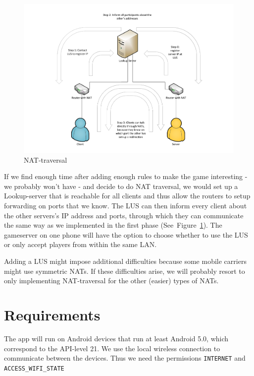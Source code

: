 \documentclass{sig-alternate}
\newcommand{\lfig}[1]{\label{fig:#1}}
\newcommand{\rfig}[1]{Figure~\ref{fig:#1}}
\begin{document}
\begin{figure}[!htbp]
	\centering
    \includegraphics[width=\columnwidth]{NATholepunching.pdf}
    \vspace{-5mm} %
	\caption{NAT-traversal}
	\lfig{nat}
\end{figure}

If we find enough time after adding enough rules to make the game interesting - we probably won't have - and decide to do NAT traversal, we would set up a Lookup-server that is reachable for all clients and thus allow the routers to setup forwarding on ports that we know. The LUS can then inform every client about the other servers's IP address and ports, through which they can communicate the same way as we implemented in the first phase (See~\rfig{nat}). The gameserver on one phone will have the option to choose whether to use the LUS or only accept players from within the same LAN.

Adding a LUS might impose additional difficulties because some mobile carriers might use symmetric NATs. If these difficulties arise, we will probably resort to only implementing NAT-traversal for the other (easier) types of NATs.

\section{Requirements}
The app will run on Android devices that run at least Android 5.0, which correspond to the API-level 21. We use the local wireless connection to communicate between the devices. Thus we need the permissions \verb|INTERNET| and \verb|ACCESS_WIFI_STATE|
\end{document}
